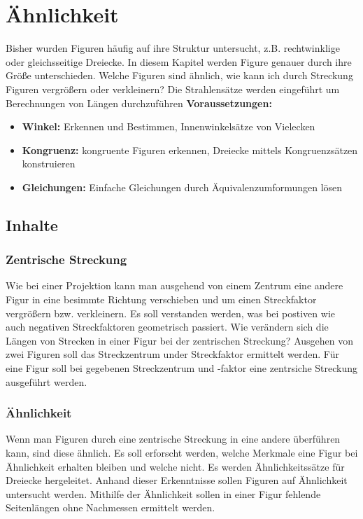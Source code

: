\documentclass{article}
\begin{document}
\section{Ähnlichkeit}
Bisher wurden Figuren häufig auf ihre Struktur untersucht, z.B. rechtwinklige oder gleichsseitige Dreiecke. In diesem Kapitel werden Figure genauer durch ihre Größe unterschieden. Welche Figuren sind ähnlich, wie kann ich durch Streckung Figuren vergrößern oder verkleinern?
Die Strahlensätze werden eingeführt um Berechnungen von Längen durchzuführen
\textbf{Voraussetzungen: }
\begin{itemize}
    \item \textbf{Winkel: }  Erkennen und Bestimmen, Innenwinkelsätze von Vielecken
    \item \textbf{Kongruenz: } kongruente Figuren erkennen, Dreiecke mittels Kongruenzsätzen konstruieren
    \item \textbf{Gleichungen: } Einfache Gleichungen durch Äquivalenzumformungen lösen 
\end{itemize}
\subsection{Inhalte}
\subsubsection*{Zentrische Streckung}
Wie bei einer Projektion kann man ausgehend von einem Zentrum eine andere Figur in eine besimmte Richtung verschieben und um einen Streckfaktor vergrößern bzw. verkleinern.
Es soll verstanden werden, was bei postiven wie auch negativen Streckfaktoren geometrisch passiert.
Wie verändern sich die Längen von Strecken in einer Figur bei der zentrischen Streckung?
Ausgehen von zwei Figuren soll das Streckzentrum under Streckfaktor ermittelt werden.
Für eine Figur soll bei gegebenen Streckzentrum und -faktor eine zentrsiche Streckung ausgeführt werden.
\subsubsection*{Ähnlichkeit}
Wenn man Figuren durch eine zentrische Streckung in eine andere überführen kann, sind diese ähnlich.
Es soll erforscht werden, welche Merkmale eine Figur bei Ähnlichkeit erhalten bleiben und welche nicht.
Es werden Ähnlichkeitssätze für Dreiecke hergeleitet.
Anhand dieser Erkenntnisse sollen Figuren auf Ähnlichkeit untersucht werden.
Mithilfe der Ähnlichkeit sollen in einer Figur fehlende Seitenlängen ohne Nachmessen ermittelt werden.
\end{document}
